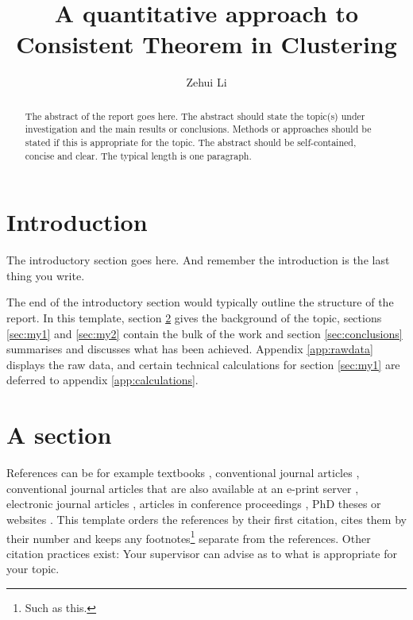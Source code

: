 \documentclass{uonmathreport}
\title{A quantitative approach to Consistent Theorem in Clustering}
\author{Zehui Li}
\begin{document}
\maketitle

\begin{abstract}
The abstract of the report goes here. The abstract should state the
topic(s) under investigation and the main results or
conclusions. Methods or approaches should be stated if this is
appropriate for the topic. The abstract should be self-contained,
concise and clear. The typical length is one paragraph.
\end{abstract}

\setcounter{tocdepth}{2}  %
\tableofcontents 
\newpage

\section{Introduction} \label{sec:intro}

The introductory section goes here. And remember the introduction
is the last thing you write.


The end of the introductory section would typically outline the
structure of the report. In this template, section \ref{sec:background}
gives the background of the topic, sections \ref{sec:my1} and
\ref{sec:my2} contain the bulk of the work and section
\ref{sec:conclusions} summarises and discusses what has been
achieved. Appendix \ref{app:rawdata} displays the raw data, and
certain technical calculations for section \ref{sec:my1} are deferred
to appendix \ref{app:calculations}.

\section{A section} \label{sec:background}

References can be for example
textbooks \cite{bott-tu,haw-ell,wolf,alling-greenleaf,hatcher},
conventional journal articles \cite{wheeler-geon,dewitt-can},
conventional journal articles that are also available at an e-print
server \cite{krasnov-louko,barrett-dawe}, electronic journal
articles \cite{poisson-livrev}, articles in conference proceedings
\cite{poisson-gr17}, PhD theses \cite{giulini-thesis,langlois-thesis}
or websites \cite{ligo-site}. This template orders the references by
their first citation, cites them by their number and keeps any
footnotes\footnote{Such as this.} separate from the references. Other
citation practices exist: Your supervisor can advise as to what is
appropriate for your topic.
\end{document}
